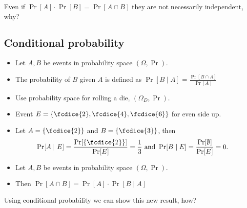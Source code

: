\documentclass{beamer}
\begin{document}
\begin{frame}
  \begin{exercise}
    Even if \(\Pr[A]\cdot \Pr[B] = \Pr[A\cap B]\) they are not necessarily 
    independent, why?
  \end{exercise}
\end{frame}

\subsection{Conditional probability}

\begin{frame}
  \begin{definition}
    \begin{itemize}
      \item Let \(A, B\) be events in probability space \((\Omega, \Pr)\).
      \item The probability of \(B\) given \(A\) is defined as \(\Pr[B\mid A] 
          = \frac{\Pr[B\cap A]}{\Pr[A]}\)
    \end{itemize}
  \end{definition}

  \pause{}
  
  \begin{example}
    \begin{itemize}
      \item Use probability space for rolling a die, \((\Omega_D, \Pr)\).
      \item Event \(E = \{\fcdice{2}, \fcdice{4}, \fcdice{6}\}\) for even side 
        up.

        \pause{}

      \item Let \(A = \{\fcdice{2}\}\) and \(B = \{\fcdice{3}\}\), then
        \[\Pr[A\mid E] = \frac{\Pr[\{\fcdice{2}\}]}{\Pr[E]} = \frac{1}{3}
          \text{ and }
          \Pr[B\mid E] = \frac{\Pr[\emptyset]}{\Pr[E]} = 0.\]

    \end{itemize}
  \end{example}
\end{frame}

\begin{frame}
  \begin{theorem}
    \begin{itemize}
      \item Let \(A, B\) be events in probability space \((\Omega, \Pr)\).
      \item Then \(\Pr[A\cap B] = \Pr[A]\cdot \Pr[B\mid A]\)
    \end{itemize}
  \end{theorem}

  \pause{}

  \begin{exercise}
    Using conditional probability we can show this new result, how?
  \end{exercise}
\end{frame}
\end{document}
